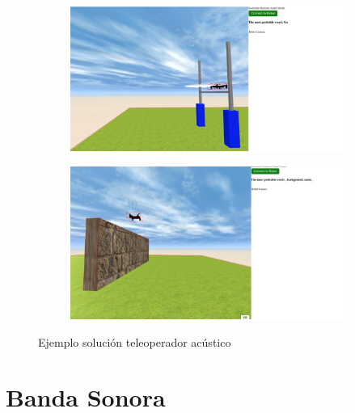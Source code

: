  \begin{figure}[H]
  \begin{subfigure}[b]{0.5\textwidth}
  \centering
    \includegraphics[width=1\textwidth, height=0.7\textwidth]{chapters/images/solucionaudio.png}
    \caption{}
    \label{fig:f1}
  \end{subfigure}
  \hfill
  \begin{subfigure}[b]{0.5\textwidth}
  \centering
    \includegraphics[width=1\textwidth, height=0.7\textwidth]{chapters/images/solucionaudio2.png}
	\caption{}    
    \label{fig:f2}
 
  \end{subfigure}
  \caption{Ejemplo solución teleoperador acústico}
\end{figure}


\section{Banda Sonora}


